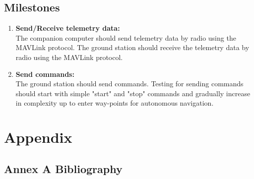 \documentclass[compsoc,draftclsnofoot,onecolumn,10pt]{IEEEtran}
\begin{document}
\subsection{Milestones}

\begin{enumerate}
	
	\item \textbf{Send/Receive telemetry data:}\\
	The companion computer should send telemetry data by radio using the MAVLink
	protocol. The ground station should receive the telemetry data by radio using
	the MAVLink protocol.
	
	\item \textbf{Send commands:}\\
	The ground station should send commands. Testing for sending commands should
	start with simple "start" and "stop" commands and gradually increase in
	complexity up to enter way-points for autonomous navigation.
	
\end{enumerate}

\section{Appendix}
\subsection{Annex A  Bibliography} 




\end{document}
